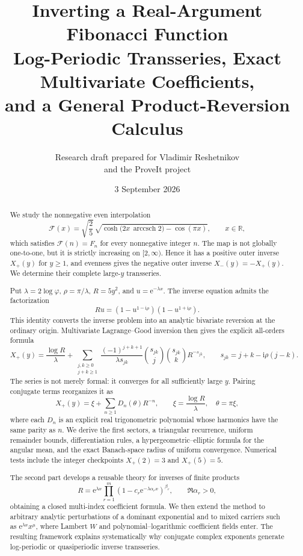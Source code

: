 \documentclass[11pt,oneside]{article}
\title{\textbf{Inverting a Real-Argument Fibonacci Function}\\[0.35em]
\Large Log-Periodic Transseries, Exact Multivariate Coefficients,\\
and a General Product-Reversion Calculus}
\author{Research draft prepared for Vladimir Reshetnikov\\and the ProveIt project}
\date{3 September 2026}
\numberwithin{equation}{section}
\theoremstyle{plain}
\theoremstyle{definition}
\theoremstyle{remark}
\newcommand{\Fcal}{\mathcal{F}}
\newcommand{\e}{\mathrm e}
\newcommand{\ii}{\mathrm i}
\newcommand{\R}{\mathbb R}
\DeclareMathOperator{\arccsch}{arccsch}
\begin{document}
\maketitle

\begin{abstract}
We study the nonnegative even interpolation
\[
 \Fcal(x)=\sqrt{\frac25}\,
 \sqrt{\cosh\!\bigl(2x\,\arccsch 2\bigr)-\cos(\pi x)},
 \qquad x\in\R,
\]
which satisfies \(\Fcal(n)=F_n\) for every nonnegative integer \(n\).
The map is not globally one-to-one, but it is strictly increasing on
\([2,\infty)\).  Hence it has a positive outer inverse \(X_+(y)\) for
\(y\ge1\), and evenness gives the negative outer inverse
\(X_-(y)=-X_+(y)\).  We determine their complete large-\(y\) transseries.

Put \(\lambda=2\log\varphi\), \(\rho=\pi/\lambda\),
\(R=5y^2\), and \(u=\e^{-\lambda x}\).  The inverse equation admits the
factorization
\[
 Ru=(1-u^{1-\ii\rho})(1-u^{1+\ii\rho}).
\]
This identity converts the inverse problem into an analytic bivariate
reversion at the ordinary origin.  Multivariate Lagrange--Good inversion
then gives the explicit all-orders formula
\[
 X_+(y)=\frac{\log R}{\lambda}
 +\sum_{\substack{j,k\ge0\\j+k\ge1}}
 \frac{(-1)^{j+k+1}}{\lambda s_{jk}}
 \binom{s_{jk}}j\binom{s_{jk}}k R^{-s_{jk}},
 \qquad
 s_{jk}=j+k-\ii\rho(j-k).
\]
The series is not merely formal: it converges for all sufficiently large
\(y\).  Pairing conjugate terms reorganizes it as
\[
 X_+(y)=\xi+\sum_{n\ge1}D_n(\theta)R^{-n},
 \qquad
 \xi=\frac{\log R}{\lambda},\quad \theta=\pi\xi,
\]
where each \(D_n\) is an explicit real trigonometric polynomial whose
harmonics have the same parity as \(n\).  We derive the first sectors,
a triangular recurrence, uniform remainder bounds, differentiation rules,
a hypergeometric--elliptic formula for the angular mean, and the exact
Banach-space radius of uniform convergence.  Numerical tests include the
integer checkpoints \(X_+(2)=3\) and \(X_+(5)=5\).

The second part develops a reusable theory for inverses of finite products
\[
 R=\e^{\lambda x}\prod_{r=1}^m
 (1-c_r\e^{-\lambda\alpha_r x})^{\beta_r},
 \qquad \Re\alpha_r>0,
\]
obtaining a closed multi-index coefficient formula.  We then extend the
method to arbitrary analytic perturbations of a dominant exponential and
to mixed carriers such as \(\e^{\lambda x}x^\mu\), where Lambert \(W\)
and polynomial--logarithmic coefficient fields enter.  The resulting
framework explains systematically why conjugate complex exponents generate
log-periodic or quasiperiodic inverse transseries.
\end{abstract}
\end{document}
